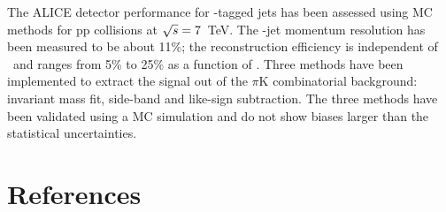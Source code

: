 \documentclass[a4paper]{jpconf}
\begin{document}
The ALICE detector performance for \Dzero-tagged jets has been assessed using MC methods
for pp collisions at $\sqrt{s}=7$~TeV. The \Dzero-jet momentum resolution has been measured to be about 11\%; the reconstruction efficiency is independent of \ptchjet\ and ranges from 5\% to 25\% as a function of \ptd.
Three methods have been implemented to extract the signal out of the $\pi$K combinatorial background: invariant mass fit, side-band and like-sign subtraction.
The three methods have been validated using a MC simulation and do not show biases larger than the statistical uncertainties.

\section*{References}
{}

\end{document}

